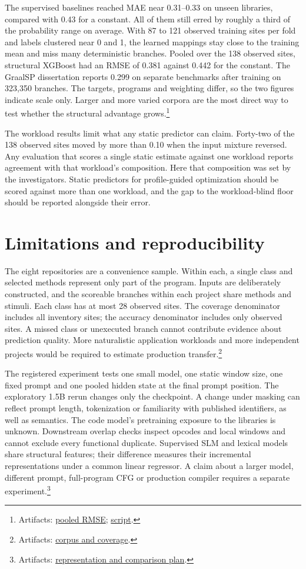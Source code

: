 \documentclass[11pt]{article}
\newcommand{\repocommit}{81d03caebe268d013b3163bcbff31cadabaaec21}
\newcommand{\repourl}{https://github.com/minggu151623/llm_profiling_research}
\newcommand{\repo}[2]{\href{\repourl/blob/\repocommit/#1}{#2}}
\newcommand{\artifacts}[1]{\footnote{Artifacts: #1.}}
\begin{document}
The supervised baselines reached MAE near 0.31--0.33 on unseen libraries, compared with 0.43 for a constant. All of them still erred by roughly a third of the probability range on average. With 87 to 121 observed training sites per fold and labels clustered near 0 and 1, the learned mappings stay close to the training mean and miss many deterministic branches. Pooled over the 138 observed sites, structural XGBoost had an RMSE of 0.381 against 0.442 for the constant. The GraalSP dissertation reports 0.299 on separate benchmarks after training on 323,350 branches. The targets, programs and weighting differ, so the two figures indicate scale only. Larger and more varied corpora are the most direct way to test whether the structural advantage grows.\artifacts{\repo{experiments/study/supplement/rmse.csv}{pooled RMSE}; \repo{ml/rmse.py}{script}}

The workload results limit what any static predictor can claim. Forty-two of the 138 observed sites moved by more than 0.10 when the input mixture reversed. Any evaluation that scores a single static estimate against one workload reports agreement with that workload's composition. Here that composition was set by the investigators. Static predictors for profile-guided optimization should be scored against more than one workload, and the gap to the workload-blind floor should be reported alongside their error.

\section{Limitations and reproducibility}

The eight repositories are a convenience sample. Within each, a single class and selected methods represent only part of the program. Inputs are deliberately constructed, and the scoreable branches within each project share methods and stimuli. Each class has at most 28 observed sites. The coverage denominator includes all inventory sites; the accuracy denominator includes only observed sites. A missed class or unexecuted branch cannot contribute evidence about prediction quality. More naturalistic application workloads and more independent projects would be required to estimate production transfer.\artifacts{\repo{experiments/study/corpus}{corpus and coverage}}

The registered experiment tests one small model, one static window size, one fixed prompt and one pooled hidden state at the final prompt position. The exploratory 1.5B rerun changes only the checkpoint. A change under masking can reflect prompt length, tokenization or familiarity with published identifiers, as well as semantics. The code model's pretraining exposure to the libraries is unknown. Downstream overlap checks inspect opcodes and local windows and cannot exclude every functional duplicate. Supervised SLM and lexical models share structural features; their difference measures their incremental representations under a common linear regressor. A claim about a larger model, different prompt, full-program CFG or production compiler requires a separate experiment.\artifacts{\repo{experiments/study/protocol.md}{representation and comparison plan}}
\end{document}
